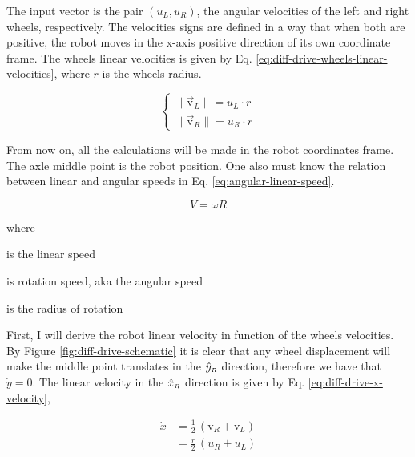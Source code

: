 \documentclass[12pt]{article}
\begin{document}
 The input vector is the pair $(u_L, u_R)$, the angular velocities of the left and right wheels, respectively. The velocities signs are defined in a way that when both are positive, the robot moves in the x-axis positive direction of its own coordinate frame. The wheels linear velocities is given by Eq. \ref{eq:diff-drive-wheels-linear-velocities}, where $r$ is the wheels radius.

 \begin{equation}
 \begin{cases}
     \lVert \vec{\mathrm{v}}_L \rVert = u_L \cdot r\\
     \lVert \vec{\mathrm{v}}_R \rVert = u_R \cdot r
 \end{cases}
     \label{eq:diff-drive-wheels-linear-velocities}
 \end{equation}
 
 From now on, all the calculations will be made in the robot coordinates frame. The axle middle point is the robot position. One also must know the relation between linear and angular speeds in Eq. \ref{eq:angular-linear-speed}.

 \begin{equation}
     V = \omega R
     \label{eq:angular-linear-speed}
 \end{equation}

 \noindent where
 \begin{description}[labelindent=10pt, labelsep=10pt]
     \item[$V$] is the linear speed
     \item[$\omega$] is rotation speed, aka the angular speed
     \item[$R$] is the radius of rotation
 \end{description}

 First, I will derive the robot linear velocity in function of the wheels velocities. By Figure \ref{fig:diff-drive-schematic} it is clear that any wheel displacement will make the middle point translates in the $\hat{y}_\mathsmaller{R}$ direction, therefore we have that $\dot{y} = 0$. The linear velocity in the $\hat{x}_\mathsmaller{R}$ direction is given by Eq. \ref{eq:diff-drive-x-velocity},

 \begin{equation}
 \begin{aligned}
     \dot{x} &= \frac{1}{2} \,(\mathrm{v}_R + \mathrm{v}_L)\\
     &= \frac{r}{2} \,(u_R + u_L)
 \end{aligned}
     \label{eq:diff-drive-x-velocity}
 \end{equation}
\end{document}

